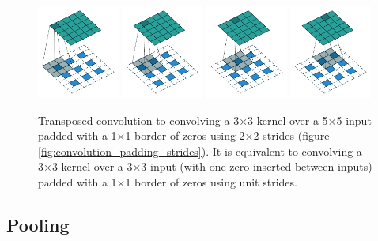 \begin{figure}[ht]
    \centering
    \includegraphics[width=0.24\textwidth]{images/padding_strides_transposed_00.pdf}
    \includegraphics[width=0.24\textwidth]{images/padding_strides_transposed_01.pdf}
    \includegraphics[width=0.24\textwidth]{images/padding_strides_transposed_02.pdf}
    \includegraphics[width=0.24\textwidth]{images/padding_strides_transposed_03.pdf}
    \caption[2D transposed convolution]{\label{fig:convolution_padding_strides_transposed}
    Transposed convolution to convolving a 3×3 kernel over a 5×5 input padded with a 1×1 border of zeros using 2×2 strides (figure \ref{fig:convolution_padding_strides}). It is equivalent to convolving a 3×3 kernel over a 3×3 input (with
    one zero inserted between inputs) padded with a 1×1 border of zeros using unit
    strides. \cite{convolutionguide}}
\end{figure}

\subsection{Pooling}
\label{subsec:pooling}

